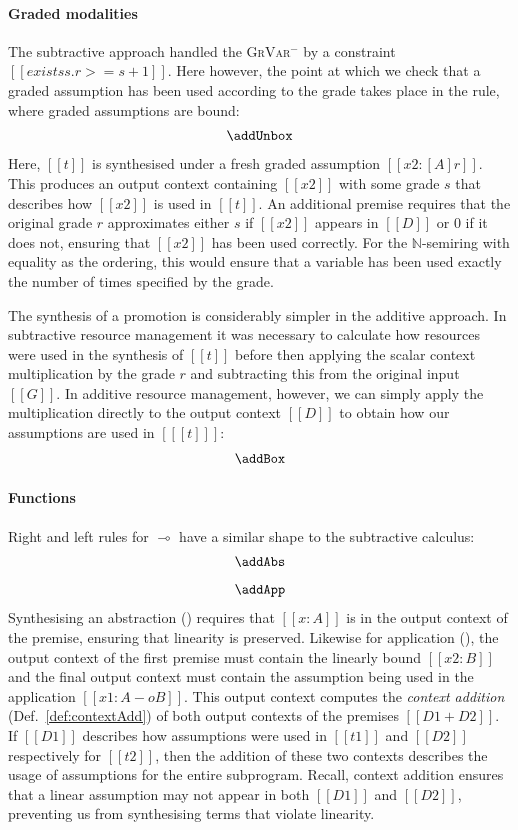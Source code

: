 \paragraph{Graded modalities}
The subtractive approach handled the \textsc{GrVar$^{-}$}
by a constraint $[[ exists s . r >= s + 1]]$. Here however, the
point at which we check that a graded assumption has been used
according to the grade takes place in the \addUnboxName rule, where graded
assumptions are bound:
%
\begin{align*}
  \addUnbox
  \end{align*}
%
Here, $[[t]]$ is synthesised under a fresh graded assumption
$[[ x2 : [A] r]]$. This produces an output context containing $[[x2]]$ with
some grade $s$ that describes how $[[x2]]$ is used in $[[t]]$. An
additional premise requires that the original grade $r$ approximates either $s$
if $[[x2]]$ appears in $[[D]]$ or $0$ if it does not,
ensuring that $[[x2]]$ has been used correctly. For the
$\mathbb{N}$-semiring with equality as the ordering, this would
ensure that a variable has been used exactly the number of times
specified by the grade.

The synthesis of a promotion is considerably simpler in the additive
approach. In subtractive resource management it was necessary to calculate how
resources were used in the synthesis of $[[t]]$ before then applying the
scalar context multiplication by the grade $r$ and subtracting this from the
original input $[[G]]$. In additive resource management, however, we can simply
apply the multiplication directly to the output context $[[D]]$ to obtain how
our assumptions are used in $[[ [t] ]]$:
%
\begin{align*}
  \addBox
\end{align*}

\paragraph{Functions}
Right and left rules for $\multimap$ have a similar shape to the
subtractive calculus:
%
\begin{align*}
\begin{array}{c}
\addAbs
\\[0.8em]
\addApp
\end{array}
\end{align*}
%
Synthesising an abstraction (\addAbsName) requires that $[[x : A]]$ is in
the output context of the premise, ensuring that linearity is preserved.
Likewise for application (\addAppName), the output
context of the first premise must contain the linearly bound $[[x2 :
B]]$ and the final output context must contain the assumption being used in the
application $[[ x1 : A -o B ]]$. This output context computes the \emph{context
addition} (Def.~\ref{def:contextAdd}) of both output contexts of the premises $[[D1 + D2]]$. If $[[D1]]$
describes how assumptions were used in $[[t1]]$ and $[[D2]]$ respectively for
$[[t2]]$, then the addition of these two contexts describes the usage of
assumptions for the entire subprogram. Recall, context addition
ensures that a linear assumption may not appear in both $[[D1]]$ and
$[[D2]]$, preventing us from synthesising terms that violate linearity.




